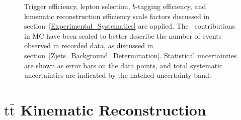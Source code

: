 \begin{figure}[htb]
\begin{center}
{        Trigger efficiency, lepton selection, $b$-tagging efficiency, and kinematic reconstruction efficiency scale factors discussed in section~\ref{Experimental_Systematics} are applied.
        The \zjets\ contributions in MC have been scaled to better describe the number of events observed in recorded data, as discussed in section~\ref{Zjets_Background_Determination}.
        Statistical uncertainties are shown as error bars on the data points, and total systematic uncertainties are indicated by the hatched uncertainty band.
        }
        \label{lepton_control}
    \end{center}
\end{figure}

\clearpage
\section{\ensuremath{\mathrm{t\bar{t}}} Kinematic Reconstruction}


